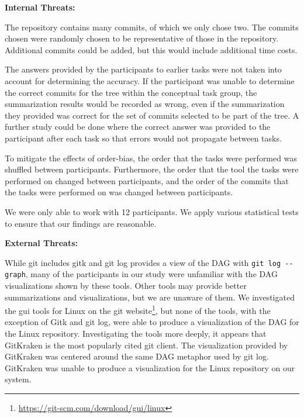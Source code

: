 
\textbf{Internal Threats:}

The repository contains many commits, of which we only chose two. The
commits chosen were randomly chosen to be representative of those in the
repository. Additional commits could be added, but this would include
additional time costs.

The answers provided by the participants to earlier tasks were not
taken into account for determining the accuracy. If the participant was
unable to determine the correct commits for the tree within the
conceptual task group, the summarization results would be recorded as
wrong, even if the summarization they provided was correct for the set
of commits selected to be part of the tree. A further study could be
done where the correct answer was provided to the participant after each
task so that errors would not propagate between tasks.

To mitigate the effects of order-bias, the order that the tasks were
performed was shuffled between participants. Furthermore, the order that
the tool the tasks were performed on changed between participants, and
the order of the commits that the tasks were performed on was changed
between participants.

We were only able to work with 12 participants. We apply various
statistical tests to ensure that our findings are reasonable.

\textbf{External Threats:}

While git includes gitk and git log provides a view of the DAG with
\verb|git log --graph|, many of the participants in our study were
unfamiliar with the DAG visualizations shown by these tools. Other tools
may provide better summarizations and visualizations, but we are unaware
of them. We investigated the gui tools for Linux on the git
website\footnote{\url{https://git-scm.com/download/gui/linux}}, but none
of the tools, with the exception of Gitk and git log, were able to
produce a visualization of the DAG for the Linux repository.
Investigating the tools more deeply, it appears that GitKraken is the
most popularly cited git client. The visualization provided by GitKraken
was centered around the same DAG metaphor used by git log. GitKraken was
unable to produce a visualization for the Linux repository on our
system.

